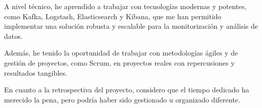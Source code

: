 A nivel técnico, he aprendido a trabajar con tecnologías modernas y potentes,
como Kafka, Logstash, Elasticsearch y Kibana, que me han permitido implementar
una solución robusta y escalable para la monitorización y análisis de datos.

Además, he tenido la oportunidad de trabajar con metodologías ágiles y de
gestión de proyectos, como Scrum, en proyectos reales con repercusiones y
resultados tangibles.

En cuanto a la retrospectiva del proyecto, considero que el tiempo dedicado ha
merecido la pena, pero podría haber sido gestionado u organizado diferente.

